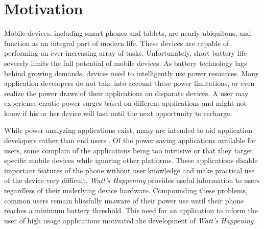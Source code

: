 \section{Motivation}
\label{sec:motivation}
Mobile devices, including smart phones and tablets, are nearly ubiquitous, and function as an integral part of modern life. 
These devices are capable of performing an ever-increasing array of tasks. 
Unfortunately, short battery life severely limits the full potential of mobile devices. 
As battery technology lags behind growing demands, devices need to intelligently use power resources. 
Many application developers do not take into account these power limitations, or even realize the power draws of their applications on disparate devices. 
A user may experience erratic power surges based on different applications and might not know if his or her device will last until the next opportunity to recharge. 

While power analyzing applications exist, many are intended to aid application developers rather than end users \cite{Pathak:2012:ESI:2168836.2168841} \cite{energy-aware}. 
Of the power saving applications available for users, some complain of the applications being too intrusive or that they target specific mobile devices while ignoring other platforms. 
These applications disable important features of the phone without user knowledge and make practical use of the device very difficult.
\emph{Watt's Happening} provides useful information to users regardless of their underlying device hardware.
Compounding these problems, common users remain blissfully unaware of their power use until their phone reaches a minimum battery threshold.
This need for an application to inform the user of high usage applications motivated the development of \emph{Watt's Happening}.
